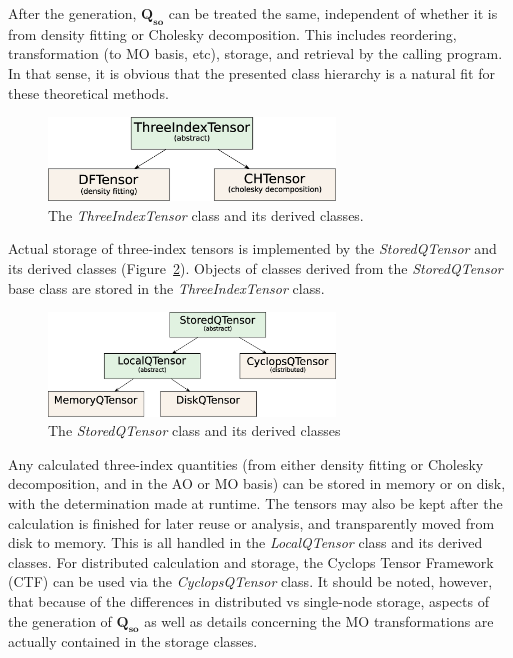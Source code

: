 \documentclass[12pt,letterpaper]{article}
\newcommand{\ten}[1]{\ensuremath{\bm{#1}}\xspace}
\newcommand{\class}[1]{\textit{#1}\xspace}
\newcommand{\Qso}{\ten{Q_{so}}}
\begin{document}
After the generation, \Qso can be treated the same, independent of
whether it is from density fitting or Cholesky decomposition. This
includes reordering, transformation (to MO basis, etc), storage, and
retrieval by the calling program.  In that sense, it is obvious that the
presented class hierarchy is a natural fit for these theoretical methods.

\begin{figure}
\centering
\includegraphics[width=3in]{images/threeindextensor}
\caption{The \class{ThreeIndexTensor} class and its derived classes.}
\label{fig:threeindextensor}
\end{figure}

Actual storage of three-index tensors is implemented
by the \class{StoredQTensor} and its derived classes
(Figure~\ref{fig:storedqtensor}).  Objects of classes derived
from the \class{StoredQTensor} base class are stored in the
\class{ThreeIndexTensor} class.

%
\begin{figure}
\centering
\includegraphics[width=3in]{images/storedqtensor}
\caption{The \class{StoredQTensor} class and its derived classes}
\label{fig:storedqtensor}
\end{figure}
%
Any calculated three-index quantities (from either density fitting
or Cholesky decomposition, and in the AO or MO basis) can be stored
in memory or on disk, with the determination made at runtime. The
tensors may also be kept after the calculation is finished for later
reuse or analysis, and transparently moved from disk to memory. This
is all handled in the \class{LocalQTensor} class and its derived
classes.  For distributed calculation and storage, the Cyclops
Tensor Framework\cite{Solomonik:2012a} (CTF) can be used via the
\class{CyclopsQTensor} class.  It should be noted, however, that because
of the differences in distributed vs single-node storage, aspects of the
generation of \Qso as well as details concerning the MO transformations
are actually contained in the storage classes.
\end{document}

